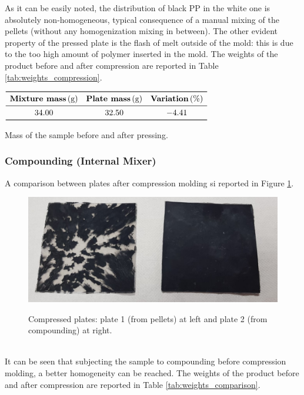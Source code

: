 \documentclass[a4paper, 11pt]{article}
\begin{document}
As it can be easily noted, the distribution of black PP in the white one is absolutely non-homogeneous, typical consequence of a manual mixing of the pellets (without any homogenization mixing in between). The other evident property of the pressed plate is the flash of melt outside of the mold: this is due to the too high amount of polymer inserted in the mold. 
The weights of the product before and after compression are reported in Table \ref{tab:weights_compression}. 

\begin{table}[htp]
	\centering
	$
	\begin{array}{ccc}
	\toprule
	\textbf{Mixture mass}\,\text{(g)} & \textbf{Plate mass}\,\text{(g)} & \textbf{Variation}\,\text{(\%)} \\
	\midrule
	34.00 & 32.50 & -4.41\\
	\bottomrule
	\end{array}
	$
	\caption{Mass of the sample before and after pressing.}
	\label{tab:weights_comparison}
\end{table}

\subsubsection{Compounding (Internal Mixer)}

A comparison between plates after compression molding si reported in Figure \ref{fig:plates}.
\begin{figure}[htp]
	\centering
	\includegraphics[scale=0.4]
	{PIATTI.jpg}
	\label{fig:plates}
	\caption{Compressed plates: plate 1 (from pellets) at left and plate 2 (from compounding) at right.}
\end{figure}\\
It can be seen that subjecting the sample to compounding before compression molding, a better homogeneity can  be reached.
The weights of the product before and after compression are reported in Table \ref{tab:weights_comparison}.
\end{document}
